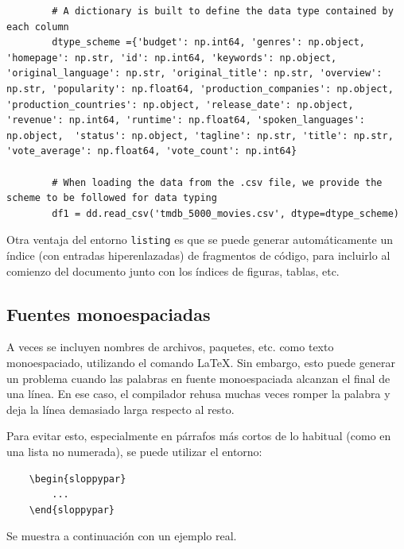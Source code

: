 \begin{listing}[h!]
	\caption{Lectura de un fichero *.csv y tipado de datos.}{}
	\label{lst:1}
	\begin{verbatim}
		# A dictionary is built to define the data type contained by each column
		dtype_scheme ={'budget': np.int64, 'genres': np.object, 'homepage': np.str, 'id': np.int64, 'keywords': np.object, 'original_language': np.str, 'original_title': np.str, 'overview': np.str, 'popularity': np.float64, 'production_companies': np.object, 'production_countries': np.object, 'release_date': np.object, 'revenue': np.int64, 'runtime': np.float64, 'spoken_languages': np.object,  'status': np.object, 'tagline': np.str, 'title': np.str, 'vote_average': np.float64, 'vote_count': np.int64}
		
		# When loading the data from the .csv file, we provide the scheme to be followed for data typing
		df1 = dd.read_csv('tmdb_5000_movies.csv', dtype=dtype_scheme)
	\end{verbatim}
\end{listing}

Otra ventaja del entorno \verb|listing| es que se puede generar automáticamente un índice
(con entradas hiperenlazadas) de fragmentos de código, para incluirlo al comienzo del 
documento junto con los índices de figuras, tablas, etc.

\subsection{Fuentes monoespaciadas}

A veces se incluyen nombres de archivos, paquetes, etc. como texto monoespaciado, utilizando
el comando \LaTeX \texttt{\texttt{}}. Sin embargo, esto puede generar un problema
cuando las palabras en fuente monoespaciada alcanzan el final de una línea. En ese caso,
el compilador rehusa muchas veces romper la palabra y deja la línea demasiado larga respecto
al resto.

Para evitar esto, especialmente en párrafos más cortos de lo habitual (como en una lista
no numerada), se puede utilizar el entorno:

\begin{verbatim}
	\begin{sloppypar}
		...
	\end{sloppypar}
\end{verbatim}

Se muestra a continuación con un ejemplo real.

